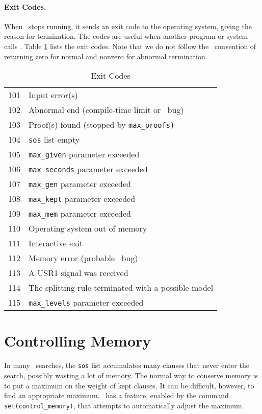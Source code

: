 \documentclass[11pt]{article}
\begin{document}
\paragraph{Exit Codes.}
When \otter\ stops running, it sends an exit code to the operating
system, giving the reason for termination.  The codes are useful when
another program or system calls \otter.  Table \ref{exit-tab}
lists the exit codes.  Note that we do not follow the \unix\
convention of returning zero for normal and nonzero for abnormal
termination.
\begin{table}[htbp] \centering
\caption{Exit Codes}  \label{exit-tab}
\begin{tabular}{cl}
\hline
101 & Input error(s) \\
102 & Abnormal end (compile-time limit or \otter\ bug) \\
103 & Proof(s) found (stopped by \verb:max_proofs):\\
104 & \verb:sos: list empty \\
105 & \verb:max_given: parameter exceeded \\
106 & \verb:max_seconds: parameter exceeded \\
107 & \verb:max_gen: parameter exceeded \\
108 & \verb:max_kept: parameter exceeded \\
109 & \verb:max_mem: parameter exceeded \\
110 & Operating system out of memory \\
111 & Interactive exit \\
112 & Memory error (probable \otter\ bug) \\
113 & A USR1 signal was received \\
114 & The splitting rule terminated with a possible model \\
115 & \verb:max_levels: parameter exceeded \\
\hline
\end{tabular}
\end{table}

\section{Controlling Memory} \label{mem-control}

In many \otter\ searches, the \verb:sos: list accumulates many
clauses that never enter the search, possibly wasting a lot
of memory.  The normal way to conserve memory is to put a maximum
on the weight of kept clauses.  It can be difficult, however, to
find an appropriate maximum.  \otter\ has a feature, enabled
by the command \verb:set(control_memory):, that attempts to 
automatically adjust the maximum.
\end{document}
